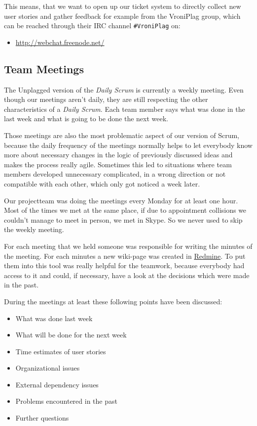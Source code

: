This means, that we want to open up our ticket system to directly collect new user stories and gather feedback for 
example from the VroniPlag group, which can be reached through their IRC channel \texttt{\#VroniPlag} on:

\begin{itemize}
\item \url{http://webchat.freenode.net/}
\end{itemize} 


\subsection{Team Meetings}

The Unplagged version of the \textit{Daily Scrum} is currently a weekly meeting. Even though our meetings aren't daily, they 
are still respecting the other characteristics of a \textit{Daily Scrum}. Each team member says what was done in 
the last week and what is going to be done the next week. 

Those meetings are also the most problematic aspect of our version of Scrum, because the daily frequency of the 
meetings normally 
helps to let everybody know more about necessary changes in the logic of previously discussed ideas and makes the 
process
really agile. Sometimes this led to situations where team members developed unnecessary complicated, in a wrong direction
or not compatible with each other, which only got noticed a week later.

Our projectteam was doing the meetings every Monday for at least one hour. Most of the times we met at the same place, 
if due to appointment collisions we couldn't manage to meet in person, we met in Skype. So we never used to skip the 
weekly meeting.

For each meeting that we held someone was responsible for writing the minutes of the meeting. For each minutes a 
new wiki-page was created in \href{http://www.redmine.org/}{Redmine}. To put them into this tool
was really helpful for the teamwork, because everybody had access to it and could, 
if necessary, have a look at the decisions which were made in the past.

During the meetings at least these following points have been discussed:

\begin{itemize}
\item What was done last week 
\item What will be done for the next week
\item Time estimates of user stories
\item Organizational issues
\item External dependency issues
\item Problems encountered in the past
\item Further questions
\end{itemize}

